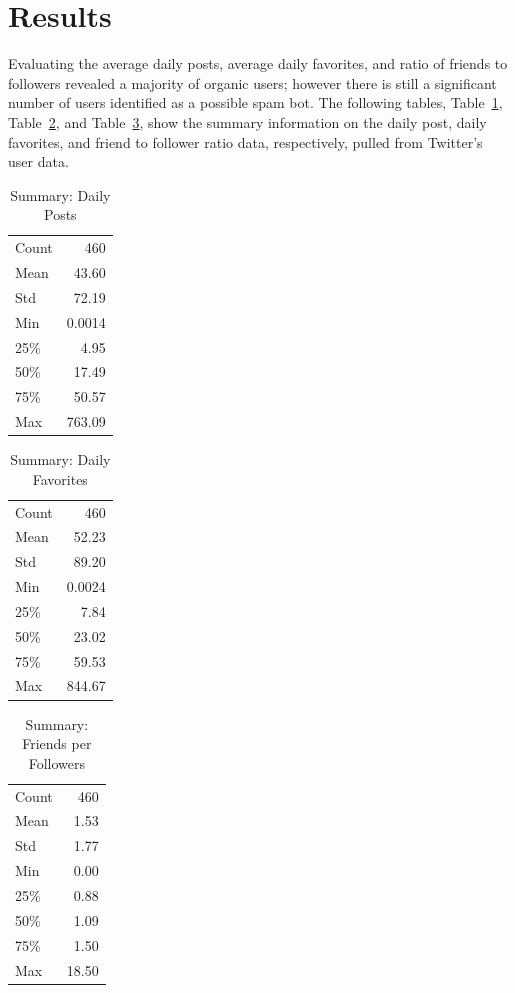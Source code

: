 \section{Results}

Evaluating the average daily posts, average daily favorites, and ratio of
friends to followers revealed a majority of organic users; however there is
still a significant number of users identified as a possible spam bot. The
following tables, Table~\ref{t:post-summary}, Table~\ref{t:faves-summary}, and
Table~\ref{t:ratio-summary},  show the summary information on the daily post,
daily favorites, and friend to follower ratio data, respectively, pulled from
Twitter's user data. 

\begin{table}[htb]
\centering
\caption{Summary: Daily Posts}
\label{t:post-summary}
\begin{tabular}{lr}
Count & 460 \\
Mean  & 43.60  \\
Std   & 72.19  \\
Min   & 0.0014 \\
25\%  & 4.95   \\
50\%  & 17.49  \\
75\%  & 50.57  \\
Max   & 763.09
\end{tabular}
\end{table}

\begin{table}[htb]
\centering
\caption{Summary: Daily Favorites}
\label{t:faves-summary}
\begin{tabular}{lr}
Count & 460  \\
Mean  & 52.23  \\
Std   & 89.20  \\
Min   & 0.0024 \\
25\%  & 7.84   \\
50\%  & 23.02  \\
75\%  & 59.53  \\
Max   & 844.67
\end{tabular}
\end{table}

\begin{table}[htb]
\centering
\caption{Summary: Friends per Followers}
\label{t:ratio-summary}
\begin{tabular}{lr}
Count & 460 \\
Mean  & 1.53   \\
Std   & 1.77   \\
Min   & 0.00   \\
25\%  & 0.88   \\
50\%  & 1.09   \\
75\%  & 1.50   \\
Max   & 18.50 
\end{tabular}
\end{table}

